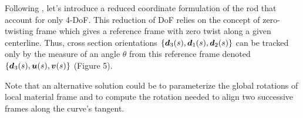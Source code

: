 Following \cite{Bergou2008}, let's introduce a reduced coordinate formulation of the rod that account for only 4-DoF. This reduction of DoF relies on the concept of zero-twisting frame which gives a reference frame with zero twist along a given centerline. Thus, cross section orientations $\{\boldsymbol{d}_3 (s),\boldsymbol{d}_1 (s),\boldsymbol{d}_2 (s)\}$ can be tracked only by the measure of an angle $\theta$ from this reference frame denoted $\{\boldsymbol{d}_3(s),\boldsymbol{u}(s),\boldsymbol{v}(s)\}$ (Figure 5).

Note that an alternative solution could be to parameterize the global rotations of local material frame and to compute the rotation needed to align two successive frames along the curve's tangent.


